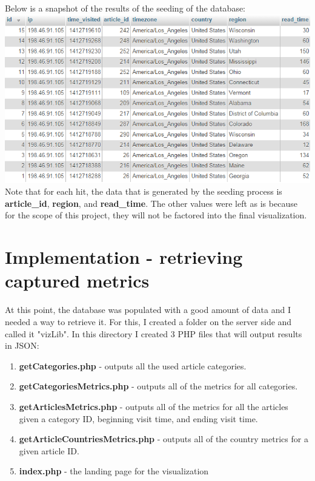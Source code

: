 \documentclass[12pt]{article}
\begin{document}
\noindent Below is a snapshot of the results of the seeding of the database: \\

\noindent\includegraphics[scale=0.8]{img/seeder_mock_hits} \\

\noindent Note that for each hit, the data that is generated by the seeding process is \textbf{article\_id}, \textbf{region}, and \textbf{read\_time}. The other values were left as is because for the scope of this project, they will not be factored into the final visualization. 

\newpage

\section{Implementation - retrieving captured metrics}
At this point, the database was populated with a good amount of data and I needed a way to retrieve it. For this, I created a folder on the server side and called it "vizLib". In this directory I created 3 PHP files that will output results in JSON:
\begin{enumerate}
\item{\textbf{getCategories.php} - outputs all the used article categories.}

\item{\textbf{getCategoriesMetrics.php} - outputs all of the metrics for all categories.}

\item{\textbf{getArticlesMetrics.php} - outputs all of the metrics for all the articles given a category ID, beginning visit time, and ending visit time.}

\item{\textbf{getArticleCountriesMetrics.php} - outputs all of the country metrics for a given article ID.}

\item{\textbf{index.php} - the landing page for the visualization}

\end{enumerate}
\end{document}
